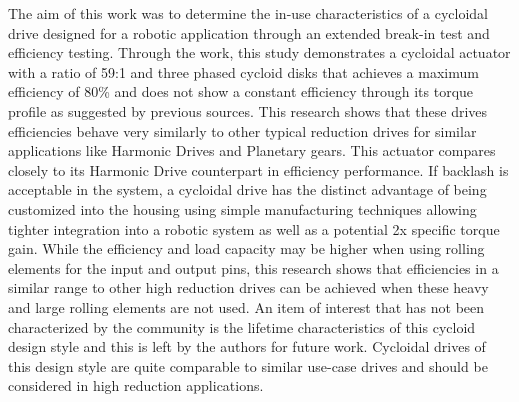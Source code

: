 The aim of this work was to determine the in-use characteristics of a cycloidal drive designed for a robotic application through an extended break-in test and efficiency testing.
Through the work, this study demonstrates a cycloidal actuator with a ratio of 59:1 and three phased cycloid disks that achieves a maximum efficiency of 80\% and does not show a constant efficiency through its torque profile as suggested by previous sources.
This research shows that these drives efficiencies behave very similarly to other typical reduction drives for similar applications like Harmonic Drives and Planetary gears.
This actuator compares closely to its Harmonic Drive counterpart in efficiency performance.
If backlash is acceptable in the system, a cycloidal drive has the distinct advantage of being customized into the housing using simple manufacturing techniques allowing tighter integration into a robotic system as well as a potential 2x specific torque gain.
While the efficiency and load capacity may be higher when using rolling elements for the input and output pins, this research shows that efficiencies in a similar range to other high reduction drives can be achieved when these heavy and large rolling elements are not used.
An item of interest that has not been characterized by the community is the lifetime characteristics of this cycloid design style and this is left by the authors for future work.
Cycloidal drives of this design style are quite comparable to similar use-case drives and should be considered in high reduction applications.

